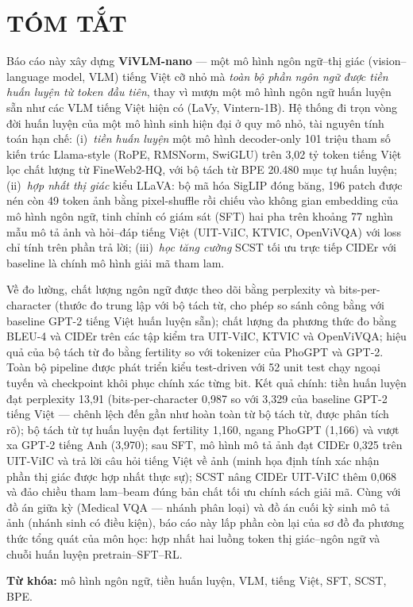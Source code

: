 \chapter*{TÓM TẮT}

Báo cáo này xây dựng \textbf{ViVLM-nano} --- một mô hình ngôn ngữ--thị giác
(vision--language model, VLM) tiếng Việt cỡ nhỏ mà \emph{toàn bộ phần ngôn ngữ
được tiền huấn luyện từ token đầu tiên}, thay vì mượn một mô hình ngôn ngữ huấn
luyện sẵn như các VLM tiếng Việt hiện có (LaVy, Vintern-1B). Hệ thống đi trọn
vòng đời huấn luyện của một mô hình sinh hiện đại ở quy mô nhỏ, tài nguyên
tính toán hạn chế:
(i)~\emph{tiền huấn luyện} một mô hình decoder-only 101 triệu tham số kiến trúc
Llama-style (RoPE, RMSNorm, SwiGLU) trên 3,02 tỷ token tiếng Việt lọc chất lượng
từ FineWeb2-HQ, với bộ tách từ BPE 20.480 mục tự huấn luyện;
(ii)~\emph{hợp nhất thị giác} kiểu LLaVA: bộ mã hóa SigLIP đóng băng, 196 patch
được nén còn 49 token ảnh bằng pixel-shuffle rồi chiếu vào không gian embedding
của mô hình ngôn ngữ, tinh chỉnh có giám sát (SFT) hai pha trên khoảng 77 nghìn
mẫu mô tả ảnh và hỏi--đáp tiếng Việt (UIT-ViIC, KTVIC, OpenViVQA) với loss chỉ
tính trên phần trả lời; (iii)~\emph{học tăng cường} SCST tối ưu trực tiếp CIDEr
với baseline là chính mô hình giải mã tham lam.

Về đo lường, chất lượng ngôn ngữ được theo dõi bằng perplexity và
bits-per-character (thước đo trung lập với bộ tách từ, cho phép so sánh công bằng
với baseline GPT-2 tiếng Việt huấn luyện sẵn); chất lượng đa phương thức đo bằng
BLEU-4 và CIDEr trên các tập kiểm tra UIT-ViIC, KTVIC và OpenViVQA; hiệu quả của
bộ tách từ đo bằng fertility so với tokenizer của PhoGPT và GPT-2. Toàn bộ
pipeline được phát triển kiểu test-driven với 52 unit test chạy ngoại tuyến
và checkpoint khôi phục chính xác từng bit.
Kết quả chính: tiền huấn luyện đạt perplexity 13,91 (bits-per-character 0,987
so với 3,329 của baseline GPT-2 tiếng Việt --- chênh lệch đến gần như hoàn
toàn từ bộ tách từ, được phân tích rõ); bộ tách từ tự huấn luyện đạt fertility
1,160, ngang PhoGPT (1,166) và vượt xa GPT-2 tiếng Anh (3,970); sau SFT, mô
hình mô tả ảnh đạt CIDEr 0,325 trên UIT-ViIC và trả lời câu hỏi tiếng Việt về
ảnh (minh họa định tính xác nhận phần thị giác được hợp nhất thực sự); SCST
nâng CIDEr UIT-ViIC thêm 0,068 và đảo chiều tham lam--beam đúng bản chất tối
ưu chính sách giải mã. Cùng với đồ án giữa kỳ (Medical VQA --- nhánh phân
loại) và đồ án cuối kỳ sinh mô tả ảnh (nhánh sinh có điều kiện), báo cáo này
lấp phần còn lại của sơ đồ đa phương thức tổng quát của môn học: hợp nhất hai
luồng token thị giác--ngôn ngữ và chuỗi huấn luyện pretrain--SFT--RL.

\textbf{Từ khóa:} mô hình ngôn ngữ, tiền huấn luyện, VLM, tiếng Việt, SFT, SCST, BPE.
\clearpage
